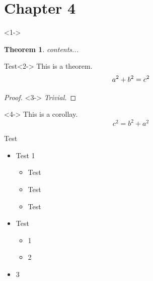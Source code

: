 \documentclass{beamer}
\newtheorem{thm}{Theorem}[theorem]
\begin{document}
	\section{Chapter 4}	
	
	\begin{frame}<1->
		 \begin{thm}
	        contents...
	        \label{thm-1}
		 \end{thm}
		\begin{block}{Test}<2->
            This is a theorem.
            \begin{equation}
                a^2 + b^2 = c^2
            	\notag	
            	\label{equ-3}
            	\end{equation}
        \end{block}
    	
		\begin{proof}<3->
            \textit{Trivial.} 
        \end{proof}
		            
        \begin{corollary}<4->
            This is a corollay.
            \begin{equation}
                c^2 = b^2 + a^2
                \label{equ-4}
            \end{equation}
        \end{corollary}
	\end{frame}
	
	\begin{frame}{Test}
		\begin{itemize}
			\item Test 1
			\begin{itemize}
				\item Test
				\item Test
				\item Test 
			\end{itemize}
			\item Test
			\begin{itemize}
				\item 1
				\item 2
			\end{itemize}
		\item 3
		\end{itemize}
		
	\end{frame}

%		
%			
%				
\end{document}
